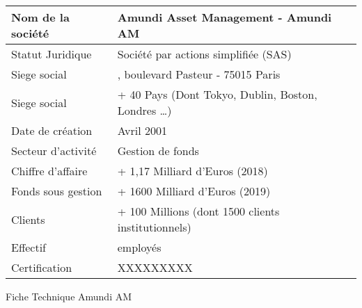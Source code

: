 \begin{center}
    \begin{tabularx}{0.8\textwidth} { 
        | >{\raggedright\arraybackslash}X
        | >{\centering\arraybackslash}X | }
    \hline
    Nom de la société   &   Amundi Asset Management - Amundi AM \\
    \hline
    Statut Juridique    &   Société par actions simplifiée (SAS)  \\
    \hline
    Siege social        &   90, boulevard Pasteur - 75015 Paris  \\
    \hline
    Siege social        &   + 40 Pays (Dont Tokyo, Dublin, Boston, Londres \dots) \\
    \hline
    Date de création    &   Avril 2001  \\
    \hline
    Secteur d’activité  &   Gestion de fonds  \\
    \hline
    Chiffre d’affaire   &   + 1,17 Milliard d'Euros (2018)  \\
    \hline
    Fonds sous gestion  &   + 1600 Milliard d'Euros (2019)  \\
    \hline
    Clients             &   + 100 Millions (dont 1500 clients institutionnels)  \\
    \hline
    Effectif            &   2000 employés\\
    \hline
    Certification       &   XXXXXXXXX  \\
    \hline
    \end{tabularx}
    \begin{table}[htp]
        \caption{Fiche Technique Amundi AM}
    \end{table}
\end{center}
